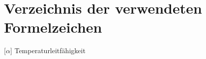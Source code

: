 \chapter*{Verzeichnis der verwendeten Formelzeichen}
\begin{acronym}[LabVIEW] %
	[\ensuremath{\alpha}]{ \acrounit{\meter^2\per\second}Temperaturleitf\"ahigkeit}
\end{acronym}